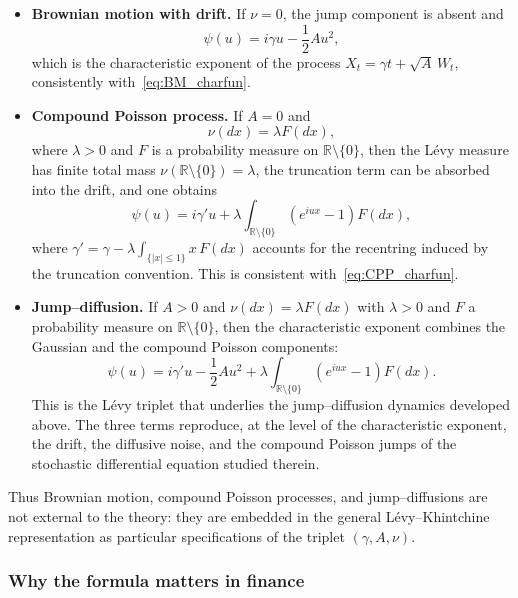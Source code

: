 \begin{itemize}[label = --]
    \item \textbf{Brownian motion with drift.} If $\nu=0$, the jump component is absent and
    \begin{equation}
    \psi(u)=i\gamma u-\frac{1}{2}Au^2,
    \end{equation}
    which is the characteristic exponent of the process $X_t = \gamma t + \sqrt{A}\,W_t$, consistently with~\eqref{eq:BM_charfun}.
    \item \textbf{Compound Poisson process.} If $A=0$ and
    \[
    \nu(dx)=\lambda F(dx),
    \]
    where $\lambda>0$ and $F$ is a probability measure on $\mathbb{R}\setminus\{0\}$, then the L\'evy measure has finite total mass $\nu(\mathbb{R}\setminus\{0\})=\lambda$, the truncation term can be absorbed into the drift, and one obtains
    \begin{equation}
    \psi(u)
    =
    i\gamma' u
    +
    \lambda
    \int_{\mathbb{R}\setminus\{0\}}
    \left(
    e^{iux}-1
    \right)F(dx),
    \end{equation}
    where $\gamma' = \gamma - \lambda\int_{\{|x|\leq 1\}} x\,F(dx)$ accounts for the recentring induced by the truncation convention. This is consistent with~\eqref{eq:CPP_charfun}.
    \item \textbf{Jump--diffusion.} If $A>0$ and $\nu(dx)=\lambda F(dx)$ with $\lambda>0$ and $F$ a probability measure on $\mathbb{R}\setminus\{0\}$, then the characteristic exponent combines the Gaussian and the compound Poisson components:
    \begin{equation}
    \psi(u)
    =
    i\gamma' u
    -\frac{1}{2}Au^2
    +
    \lambda
    \int_{\mathbb{R}\setminus\{0\}}
    \left(
    e^{iux}-1
    \right)F(dx).
    \end{equation}
    This is the L\'evy triplet that underlies the jump--diffusion dynamics developed above. The three terms reproduce, at the level of the characteristic exponent, the drift, the diffusive noise, and the compound Poisson jumps of the stochastic differential equation studied therein.
\end{itemize}

Thus Brownian motion, compound Poisson processes, and jump--diffusions are not external to the theory: they are embedded in the general L\'evy--Khintchine representation as particular specifications of the triplet $(\gamma,A,\nu)$.
\subsubsection{Why the formula matters in finance}

